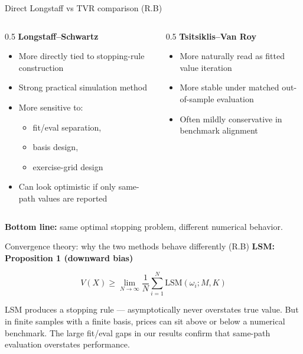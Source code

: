 \documentclass[
  11pt,
  ignorenonframetext,
  aspectratio=169,
]{beamer}
\providecommand{\tightlist}{%
  \setlength{\itemsep}{0pt}\setlength{\parskip}{0pt}}
\begin{document}
\begin{frame}{Direct Longstaff vs TVR comparison (R.B)}
\label{direct-longstaff-vs-tvr-comparison-r.b}
\begin{columns}[T]
\begin{column}{0.5\linewidth}
\textbf{Longstaff--Schwartz}

\begin{itemize}
\item
  More directly tied to stopping-rule construction
\item
  Strong practical simulation method
\item
  More sensitive to:

  \begin{itemize}
  \tightlist
  \item
    fit/eval separation,
  \item
    basis design,
  \item
    exercise-grid design
  \end{itemize}
\item
  Can look optimistic if only same-path values are reported
\end{itemize}
\end{column}

\begin{column}{0.5\linewidth}
\textbf{Tsitsiklis--Van Roy}

\begin{itemize}
\tightlist
\item
  More naturally read as fitted value iteration
\item
  More stable under matched out-of-sample evaluation
\item
  Often mildly conservative in benchmark alignment
\end{itemize}
\end{column}
\end{columns}

\textbf{Bottom line:} same optimal stopping problem, different numerical
behavior.
\end{frame}

\begin{frame}{Convergence theory: why the two methods behave differently
(R.B)}
\label{convergence-theory-why-the-two-methods-behave-differently-r.b}
\textbf{LSM: Proposition 1 (downward bias)}

\[V(X) \geq \lim_{N\to\infty} \frac{1}{N}\sum_{i=1}^N \text{LSM}(\omega_i; M, K)\]

LSM produces a stopping rule --- asymptotically never overstates true
value. But in finite samples with a finite basis, prices can sit above
or below a numerical benchmark. The large fit/eval gaps in our results
confirm that same-path evaluation overstates performance.
\end{frame}
\end{document}
